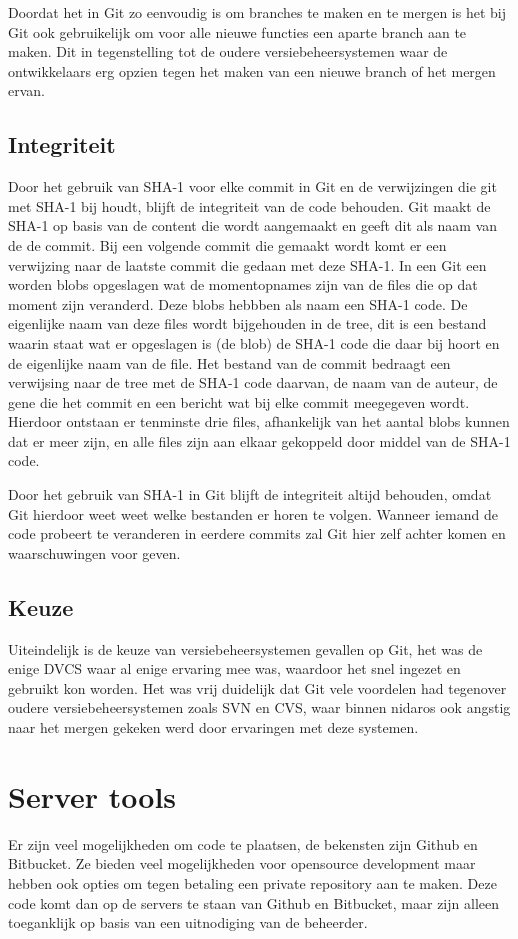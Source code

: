 \documentclass[a4paper,11pt,oneside]{report}
\begin{document}
Doordat het in Git zo eenvoudig is om branches te maken en te mergen is het bij
Git ook gebruikelijk om voor alle nieuwe functies een aparte branch aan te
maken. Dit in tegenstelling tot de oudere versiebeheersystemen waar de
ontwikkelaars erg opzien tegen het maken van een nieuwe branch of het mergen
ervan.

\subsection{Integriteit}
Door het gebruik van SHA-1 voor elke commit in Git en de verwijzingen die git
met SHA-1 bij houdt, blijft de integriteit van de code behouden. Git maakt de
SHA-1 op basis van de content die wordt aangemaakt en geeft dit als naam van de
de commit. Bij een volgende commit die gemaakt wordt komt er een verwijzing naar
de laatste commit die gedaan met deze SHA-1. In een Git een worden blobs
opgeslagen wat de momentopnames zijn van de files die op dat moment zijn
veranderd. Deze blobs hebbben als naam een SHA-1 code. De eigenlijke naam van
deze files wordt bijgehouden in de tree, dit is een bestand waarin staat wat er
opgeslagen is (de blob) de SHA-1 code die daar bij hoort en de eigenlijke naam
van de file. Het bestand van de commit bedraagt een verwijsing naar de tree met
de SHA-1 code daarvan, de naam van de auteur, de gene die het commit en een
bericht wat bij elke commit meegegeven wordt. Hierdoor ontstaan er tenminste
drie files, afhankelijk van het aantal blobs kunnen dat er meer zijn, en alle
files zijn aan elkaar gekoppeld door middel van de SHA-1 code.

Door het gebruik van SHA-1 in Git blijft de integriteit altijd behouden, omdat
Git hierdoor weet weet welke bestanden er horen te volgen. Wanneer iemand de
code probeert te veranderen in eerdere commits zal Git hier zelf achter komen en
waarschuwingen voor geven.

\subsection{Keuze}
Uiteindelijk is de keuze van versiebeheersystemen gevallen op Git, het was de
enige DVCS waar al enige ervaring mee was, waardoor het snel ingezet en gebruikt
kon worden. Het was vrij duidelijk dat Git vele voordelen had tegenover oudere
versiebeheersystemen zoals SVN en CVS, waar binnen nidaros ook angstig naar het
mergen gekeken werd door ervaringen met deze systemen.

\section{Server tools}
Er zijn veel mogelijkheden om code te plaatsen, de bekensten zijn Github en
Bitbucket. Ze bieden veel mogelijkheden voor opensource development maar hebben
ook opties om tegen betaling een private repository aan te maken. Deze code komt
dan op de servers te staan van Github en Bitbucket, maar zijn alleen toeganklijk
op basis van een uitnodiging van de beheerder.
\end{document}
